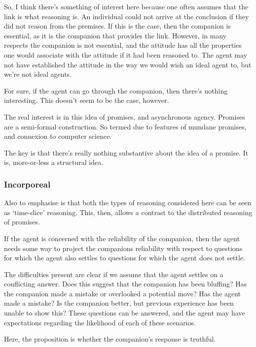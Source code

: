 \documentclass[10pt]{article}
\begin{document}
So, I think there's something of interest here because one often assumes that the link is what reasoning is.
An individual could not arrive at the conclusion if they did not reason from the premises.
If this is the case, then the companion is essential, as it is the companion that provides the link.
However, in many respects the companion is not essential, and the attitude has all the properties one would associate with the attitude if it had been reasoned to.
The agent may not have established the attitude in the way we would wish an ideal agent to, but we're not ideal agents.

For sure, if the agent can go through the companion, then there's nothing interesting.
This doesn't seem to be the case, however.

The real interest is in this idea of promises, and asynchronous agency.
Promises are a semi-formal construction.
So termed due to features of mundane promises, and connexion to computer science.

The key is that there's really nothing substantive about the idea of a promise.
It is, more-or-less a structural idea.



\subsubsection{Incorporeal}
\label{sec:incorporeal}

\begin{note}
  Also to emphasise is that both the types of reasoning considered here can be seen as `time-slice' reasoning.
  This, then, allows a contrast to the distributed reasoning of promises.
\end{note}

If the agent is concerned with the reliability of the companion, then the agent needs some way to project the companions reliability with respect to questions for which the agent also settles to questions for which the agent does not settle.

The difficulties present are clear if we assume that the agent settles on a conflicting answer.
Does this suggest that the companion has been bluffing?
Has the companion made a mistake or overlooked a potential move?
Has the agent made a mistake?
Is the companion better, but previous experience has been unable to show this?
These questions can be answered, and the agent may have expectations regarding the likelihood of each of these scenarios.

Here, the proposition is whether the companion's response is truthful.
\end{document}
